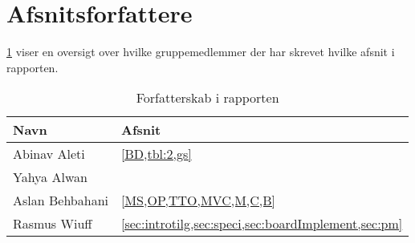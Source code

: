 \appendix
\appendixpage
\addappheadtotoc
\section{Afsnitsforfattere}\label{sec:arbejde}
\cref{tbl:arbejde} viser en oversigt over hvilke gruppemedlemmer der har skrevet hvilke afsnit i rapporten.
\begin{table}[H]
    \centering
    \caption{Forfatterskab i rapporten}\label{tbl:arbejde}
    \begin{tabular}{ll}
        \toprule
        Navn            & Afsnit                                                   \\
        \midrule
        Abinav Aleti    & \cref{BD,tbl:2,gs}                                                \\
        \midrule
        Yahya Alwan     &                                                          \\
        \midrule
        Aslan Behbahani & \cref{MS,OP,TTO,MVC,M,C,B}                               \\
        \midrule
        Rasmus Wiuff    & \cref{sec:introtilg,sec:speci,sec:boardImplement,sec:pm} \\
        \bottomrule
    \end{tabular}
\end{table}